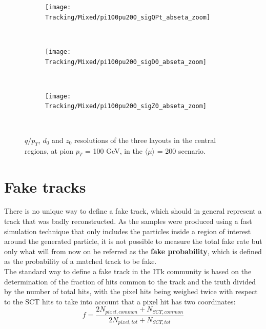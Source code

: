 \documentclass[a4paper,twoside,12pt]{book}
\begin{document}
\begin{figure}
\begin{subfigure}{\linewidth}
\centering
\texttt{[image: Tracking/Mixed/pi100pu200\_sigQPt\_abseta\_zoom]}
\caption{}
\label{fig:tracking:pi100pu200_sigQPt_abseta_zoom}
\end{subfigure}\\[1ex]
\begin{subfigure}{\linewidth}
\centering
\texttt{[image: Tracking/Mixed/pi100pu200\_sigD0\_abseta\_zoom]}
\caption{}
\label{fig:tracking:pi100pu200_sigD0_abseta_zoom}
\end{subfigure}\\[1ex]
\begin{subfigure}{\linewidth}
\centering
\texttt{[image: Tracking/Mixed/pi100pu200\_sigZ0\_abseta\_zoom]}
\caption{}
\label{fig:tracking:pi100pu200_sigZ0_abseta_zoom}
\end{subfigure}\\[1ex]
\caption{$q/p_{T}$, $d_{0}$ and $z_{0}$ resolutions of the three layouts in the central regions, at pion $p_{T}$ = 100 GeV, in the $\langle\mu\rangle$ = 200 scenario.}
\label{fig:tracking:pt100resolutions_zoom}
\end{figure}


\section{Fake tracks}
There is no unique way to define a fake track, which should in general represent a track that was badly reconstructed. As the samples were produced using a fast simulation technique that
only includes the particles inside a region of interest around the generated particle, it is not possible to measure the total fake rate but only what will from now on be referred
as the \textbf{fake probability}, which is defined as the probability of a matched track to be fake. \\

The standard way to define a fake track in the ITk community is based on the determination of
 the fraction of hits common to the track and the truth divided by the number of total hits, with the pixel hits being weighed twice with respect to the SCT hits to take into account that a pixel hit has two coordinates: \\
$$
f = \frac{2N_{pixel, common} + N_{SCT, common}}{2N_{pixel, tot} + N_{SCT, tot}}
$$
\end{document}
